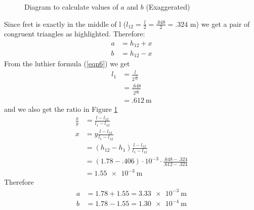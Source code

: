 \begin{itemize}
\begin{figure}[ht]
        \caption{Diagram to calculate values of $a$ and $b$ (Exaggerated)} \label{fig4}
    \end{figure}
    \FloatBarrier
    Since fret  is exactly in the middle of l ($l_{12} = \frac{l}{2} = \frac{.648}{2} = .324$ m) we get a pair of congruent triangles as highlighted. Therefore:
    \begin{align*}
        a &= h_{12} + x \\
        b &= h_{12} - x
    \end{align*}
    From the luthier formula (\ref{eqn6}) we get
    \begin{align*}
        l_1 &= \frac{l}{2^{\frac{1}{12}}} \\
            &= \frac{.648}{2^{\frac{1}{12}}} \\
            &= \SI{.612}{\meter}
    \end{align*}
    and we also get the ratio in Figure \ref{fig4}
    \begin{align*}
        \frac{x}{y} &= \frac{l-l_{12}}{l_1-l_{12}} \\
        x &= y\frac{l-l_{12}}{l_1-l_{12}} \\
        &= (h_{12}-h_1)\frac{l-l_{12}}{l_1-l_{12}} \\
        &= (1.78-.406) \cdot 10^{-3} \cdot \frac{.648-.324}{.612-.324} \\
        &= \SI{1.55e-3}{\meter}
    \end{align*}
    Therefore
    \begin{align*}
        a &= 1.78 + 1.55 = \SI{3.33e-3}{\meter} \\
        b &= 1.78 - 1.55 = \SI{1.30e-4}{\meter}
    \end{align*}    
\end{itemize}
